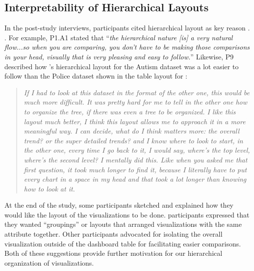 \subsection{Interpretability of Hierarchical Layouts}
\par In the post-study interviews, participants cited hierarchical layout as  key reason . . For example, P1.A1 stated that ``\textit{the hierarchical nature [is] a very natural flow...so when you are comparing, you don't have to be making those comparisons in your head, visually that is very pleasing and easy to follow.}'' %
Likewise, P9 described how \system's hierarchical layout for the Autism dataset was a lot easier to follow than the Police dataset shown in the table layout for \cluster:
\begin{quote}
\textit{If I had to look at this dataset in the format of the other one, this would be much more difficult. It was pretty hard for me to tell in the other one how to organize the tree, if there was even a tree to be organized. I like this layout much better, I think this layout allows me to approach it in a more meaningful way. I can decide, what do I think matters more: the overall trend? or the super detailed trends? and I know where to look to start, in the other one, every time I go back to it, I would say, where's the top level, where's the second level? I mentally did this. Like when you asked me that first question, it took much longer to find it, because I literally have to put every chart in a space in my head and that took a lot longer than knowing how to look at it.}
\end{quote}
At the end of the study, some participants  sketched and explained how they would like the layout of the visualizations to be done.  participants expressed that they wanted ``groupings'' or layouts that arranged visualizations with the same attribute together. Other participants advocated for isolating the overall visualization outside of the dashboard table for facilitating easier comparisons. Both of these suggestions provide further motivation for our hierarchical organization of visualizations. 
